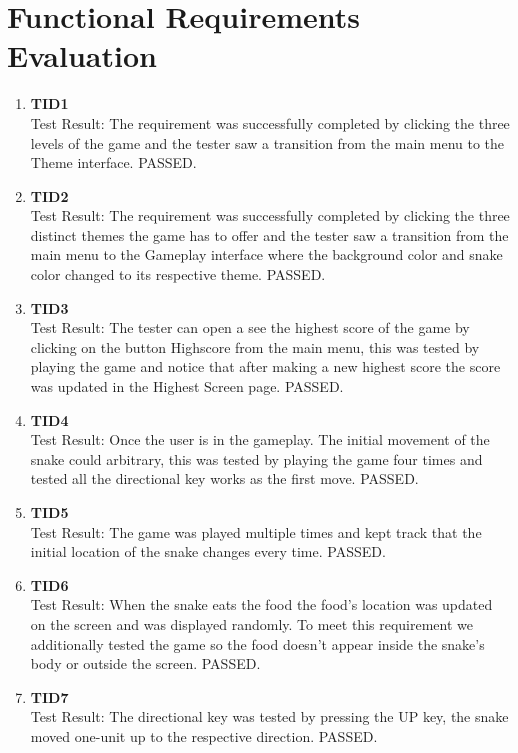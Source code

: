 \documentclass[12pt, titlepage]{article}
\begin{document}
\section{Functional Requirements Evaluation}
\begin{enumerate}
	\item{\textbf{TID1}\\}
	Test Result: 
	The requirement was successfully completed by clicking the three levels of the game and the tester saw a transition from the main menu to the Theme
	interface. PASSED.

	\item{\textbf{TID2}\\}
	Test Result:
	The requirement was successfully completed by clicking the three distinct themes the game has to offer and the tester saw a transition from the main menu
	to the Gameplay interface where the background color and snake color changed to its respective theme. PASSED.

	\item{\textbf{TID3}\\}
	Test Result:
	The tester can open a see the highest score of the game by clicking on the button Highscore from the main menu, this was tested by playing the game and notice that after making a new highest score the score was updated in the Highest Screen page. PASSED.


	\item{\textbf{TID4}\\}
	Test Result:
	Once the user is in the gameplay. The initial movement of the snake could arbitrary, this was tested by playing the game four times and tested all the directional key works as the first move. PASSED.

	\item{\textbf{TID5}\\}
	Test Result:
	The game was played multiple times and kept track that the initial location of the snake changes every time. PASSED.


	\item{\textbf{TID6}\\}
	Test Result:
	When the snake eats the food the food's location was updated on the screen and was displayed randomly. To meet this requirement we additionally tested the game so the food doesn't appear inside the snake's body or outside the screen. PASSED.

	\item{\textbf{TID7}\\}
	Test Result:
	The directional key was tested by pressing the UP key, the snake moved one-unit up to the respective direction. PASSED.


\end{enumerate}
\end{document}
